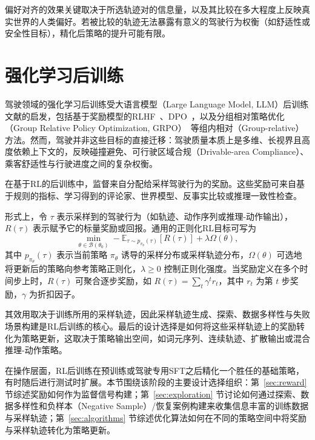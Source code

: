 \documentclass[runningheads]{llncs}
\begin{document}
偏好对齐的效果关键取决于所选轨迹对的信息量，以及其比较在多大程度上反映真实世界的人类偏好。若被比较的轨迹无法暴露有意义的驾驶行为权衡（如舒适性或安全性目标），精化后策略的提升可能有限。

\section{强化学习后训练}
\label{sec:rl}




驾驶领域的强化学习后训练受大语言模型（Large Language Model, LLM）后训练文献的启发，包括基于奖励模型的RLHF~\cite{ouyang2022instructgpt}、DPO~\cite{rafailov2023dpo}，以及分组相对策略优化（Group Relative Policy Optimization, GRPO）~\cite{shao2024deepseekmath,deepseek_r1_2025}等组内相对（Group-relative）方法。然而，驾驶并非这些目标的直接迁移：驾驶质量本质上是多维、长视界且高度依赖上下文的，反映碰撞避免、可行驶区域合规（Drivable-area Compliance）、乘客舒适性与行驶进度之间的复杂权衡。
 

在基于RL的后训练中，监督来自分配给采样驾驶行为的奖励。这些奖励可来自基于规则的指标、学习得到的评论家、世界模型、反事实比较或推理一致性检查。

形式上，令 $\tau$ 表示采样到的驾驶行为（如轨迹、动作序列或推理-动作输出），$R(\tau)$ 表示赋予它的标量奖励或回报。通用的正则化RL目标可写为
\begin{equation}
\min_{\theta \in \mathcal{B}(\theta_0)}
-
\mathbb{E}_{\tau\sim p_{\pi_\theta}(\tau)}
\left[
R(\tau)
\right]
+
\lambda\Omega(\theta),
\label{eq:rl_post_training}
\end{equation}
其中 $p_{\pi_\theta}(\tau)$ 表示当前策略 $\pi_\theta$ 诱导的采样分布或采样轨迹分布，$\Omega(\theta)$ 可选地将更新后的策略向参考策略正则化，$\lambda\ge 0$ 控制正则化强度。当奖励定义在多个时间步上时，$R(\tau)$ 可聚合逐步奖励，如 $R(\tau)=\sum_t \gamma^t r_t$，其中 $r_t$ 为第 $t$ 步奖励，$\gamma$ 为折扣因子。

其效用取决于训练所用的采样轨迹，因此采样轨迹生成、探索、数据多样性与失败场景构建是RL后训练的核心。最后的设计选择是如何将这些采样轨迹上的奖励转化为策略更新，这取决于策略输出空间，如词元序列、连续轨迹、扩散输出或混合推理-动作策略。


在操作层面，RL后训练在预训练或驾驶专用SFT之后精化一个胜任的基础策略，有时随后进行测试时扩展。本节围绕该阶段的主要设计选择组织：第~\ref{sec:reward} 节综述奖励如何作为监督信号构建；第~\ref{sec:exploration} 节讨论如何通过探索、数据多样性和负样本（Negative Sample）/恢复案例构建来收集信息丰富的训练数据与采样轨迹；第~\ref{sec:algorithms} 节综述优化算法如何在不同的策略空间中将奖励与采样轨迹转化为策略更新。
\end{document}
